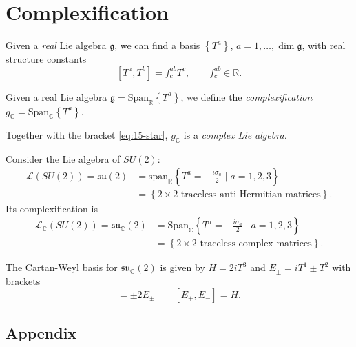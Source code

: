 \section{Complexification}%
\label{sec:complexification}

Given a \emph{real} Lie algebra $\mathfrak{g}$, we can find a basis $\left\{ T^{a} \right\}$, $a = 1, \dots, \dim \mathfrak{g}$, with real structure constants
\begin{equation}
  \label{eq:15-star}
  [T^{a}, T^{b}] = f^{ab}_{c} T^{c}, \qquad f^{ab}_{c} \in \mathbb{R}.
\end{equation}
\begin{definition}[]
  Given a real Lie algebra $\mathfrak{g} = \text{Span}_{\mathbb{R}} \left\{ T^{a} \right\}$, we define the \emph{complexification} $g_{\mathbb{C}} = \text{Span}_{\mathbb{C}} \left\{ T^{a} \right\}$.
\end{definition}
Together with the bracket \eqref{eq:15-star}, $g_{\mathbb{C}}$ is a \emph{complex Lie algebra.}
\begin{example}[]
  Consider the Lie algebra of $SU(2)$:
  \begin{align}
    \mathscr{L}(SU(2)) = \mathfrak{su}(2) &= \text{span}_{\mathbb{R}} \left\{ T^{a} = -\frac{i\sigma_{a}}{2} \mid a = 1,2,3 \right\} \\
		     &= \left\{ 2 \times 2 \text{ traceless anti-Hermitian matrices} \right\}.
  \end{align}
  Its complexification is
  \begin{align}
    \mathscr{L}_{\mathbb{C}}(SU(2)) = \mathfrak{su}_{\mathbb{C}}(2) &= \text{Span}_{\mathbb{C}}\left\{T^{a} = -\frac{i\sigma_{a}}{2} \mid a = 1,2,3\right\} \\
    &= \left\{ 2 \times 2 \text{ traceless complex matrices} \right\}.
  \end{align}
\end{example}

The Cartan-Weyl basis for $\mathfrak{su}_{\mathbb{C}}(2)$ is given by $H = 2 i T^3$ and $E_\pm = i T^1 \pm T^2$ with brackets
\begin{equation}
  [H, E_\pm] = \pm 2 E_{\pm} \qquad [E_+, E_-] = H.
\end{equation}

\subsection*{Appendix}%

